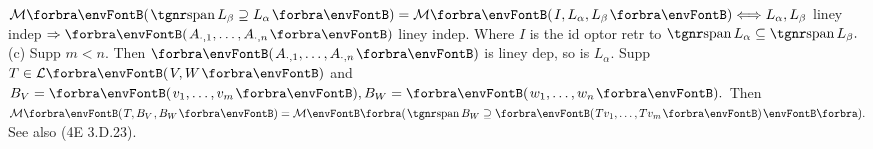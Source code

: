 \Hb\AComm $\Mt{\Spn L_{\beta}\supseteq L_\alpha}=\Mt{I,L_{\alpha},L_{\beta}}\Longleftrightarrow L_{\alpha},L_{\beta}$ liney indep $\Rightarrow\Par{A_{\cdot,1},\dots,A_{\cdot,n}}$ liney indep.\parCom{\Hb\IndentB}
Where $I$ is the id optor retr to $\Spn L_{\alpha}\subseteq\Spn L_{\beta}.$
\vspace{3pt}\TextB{}
(c) Supp $m<n.$ Then $\Par{A_{\cdot,1},\dots,A_{\cdot,n}}$ is liney dep, so is $L_{\alpha}.$\TextB{\vspace{5pt}}
Supp $T\in\Lm{V,W}$ and $B_V=\Par{v_1,\dots,v_m},B_W=\Par{w_1,\dots,w_n}.$\TextB{}
Then $\Mt{T,B_V\hspace{1pt},B_W}=\Mt[\BigPar]{\Spn B_W\supseteq\Par{Tv_1,\dots,Tv_m}}.$ \; \AComm See also (4E 3.D.23).
\SepLine

\pagebreak
\def\fT{\mathcal{T}}\def\fC{\mathcal{C}}\def\fR{\mathcal{R}}\def\fP{\mathcal{E}}


